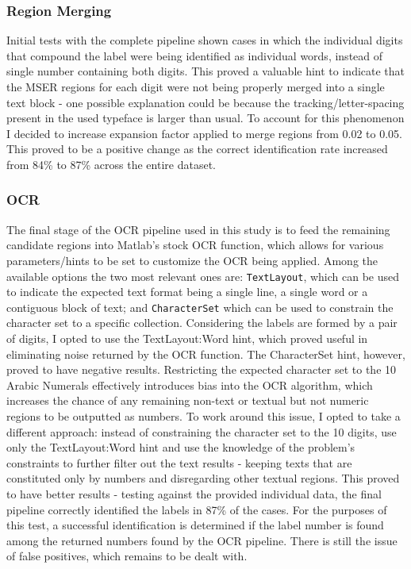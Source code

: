 \documentclass[11pt]{article}
\begin{document}
    \subsubsection{Region Merging}
        Initial tests with the complete pipeline shown cases in which the individual digits that compound the label were being identified as individual words, instead of single number containing both digits. This proved a valuable hint to indicate that the MSER regions for each digit were not being properly merged into a single text block - one possible explanation could be because the tracking/letter-spacing present in the used typeface is larger than usual. To account for this phenomenon I decided to increase expansion factor applied to merge regions from 0.02 to 0.05. This proved to be a positive change as the correct identification rate increased from 84\% to 87\% across the entire dataset.

    \subsubsection{OCR}
        The final stage of the OCR pipeline used in this study is to feed the remaining candidate regions into Matlab's stock OCR function, which allows for various parameters/hints to be set to customize the OCR being applied. Among the available options the two most relevant ones are: \texttt{TextLayout}, which can be used to indicate the expected text format being a single line, a single word or a contiguous block of text; and \texttt{CharacterSet} which can be used to constrain the character set to a specific collection. Considering the labels are formed by a pair of digits, I opted to use the TextLayout:Word hint, which proved useful in eliminating noise returned by the OCR function. The CharacterSet hint, however, proved to have negative results. Restricting the expected character set to the 10 Arabic Numerals effectively introduces bias into the OCR algorithm, which increases the chance of any remaining non-text or textual but not numeric regions to be outputted as numbers. To work around this issue, I opted to take a different approach: instead of constraining the character set to the 10 digits, use only the TextLayout:Word hint and use the knowledge of the problem's constraints to further filter out the text results - keeping texts that are constituted only by numbers and disregarding other textual regions. This proved to have better results - testing against the provided individual data, the final pipeline correctly identified the labels in 87\% of the cases. For the purposes of this test, a successful identification is determined if the label number is found among the returned numbers found by the OCR pipeline. There is still the issue of false positives, which remains to be dealt with.
\end{document}
